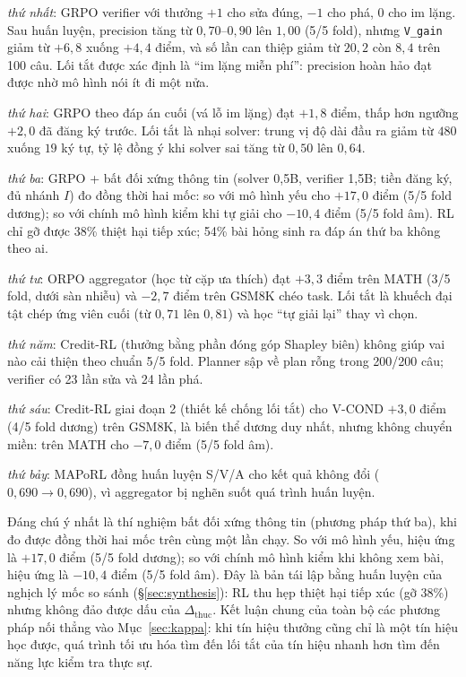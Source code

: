 \documentclass[12pt,a4paper]{article}
\newcommand{\dhonest}{\Delta_{\mathrm{thuc}}}
\begin{document}
\textit{thứ nhất}: GRPO verifier với thưởng \(+1\) cho sửa đúng, \(-1\) cho phá, \(0\) cho im lặng. Sau huấn luyện, precision tăng từ \(0{,}70\)--\(0{,}90\) lên \(1{,}00\) (5/5 fold), nhưng \texttt{V\_gain} giảm từ \(+6{,}8\) xuống \(+4{,}4\) điểm, và số lần can thiệp giảm từ \(20{,}2\) còn \(8{,}4\) trên 100 câu. Lối tắt được xác định là “im lặng miễn phí”: precision hoàn hảo đạt được nhờ mô hình nói ít đi một nửa.


\textit{thứ hai}: GRPO theo đáp án cuối (vá lỗ im lặng) đạt \(+1{,}8\) điểm, thấp hơn ngưỡng \(+2{,}0\) đã đăng ký trước. Lối tắt là nhại solver: trung vị độ dài đầu ra giảm từ \(480\) xuống \(19\) ký tự, tỷ lệ đồng ý khi solver sai tăng từ \(0{,}50\) lên \(0{,}64\).

\textit{thứ ba}: GRPO + bất đối xứng thông tin (solver 0,5B, verifier 1,5B; tiền đăng ký, đủ nhánh \(I\)) đo đồng thời hai mốc: so với mô hình yếu cho \(+17{,}0\) điểm (5/5 fold dương); so với chính mô hình kiểm khi tự giải cho \(-10{,}4\) điểm (5/5 fold âm). RL chỉ gỡ được 38\% thiệt hại tiếp xúc; 54\% bài hỏng sinh ra đáp án thứ ba không theo ai.

\textit{thứ tư}: ORPO aggregator (học từ cặp ưa thích) đạt \(+3{,}3\) điểm trên MATH (3/5 fold, dưới sàn nhiễu) và \(-2{,}7\) điểm trên GSM8K chéo task. Lối tắt là khuếch đại tật chép ứng viên cuối (từ \(0{,}71\) lên \(0{,}81\)) và học “tự giải lại” thay vì chọn.

\textit{thứ năm}: Credit-RL (thưởng bằng phần đóng góp Shapley biên) không giúp vai nào cải thiện theo chuẩn 5/5 fold. Planner sập về plan rỗng trong 200/200 câu; verifier có 23 lần sửa và 24 lần phá.

\textit{thứ sáu}: Credit-RL giai đoạn 2 (thiết kế chống lối tắt) cho V-COND \(+3{,}0\) điểm (4/5 fold dương) trên GSM8K, là biến thể dương duy nhất, nhưng không chuyển miền: trên MATH cho \(-7{,}0\) điểm (5/5 fold âm).

\textit{thứ bảy}: MAPoRL đồng huấn luyện S/V/A cho kết quả không đổi (\(0{,}690 \to 0{,}690\)), vì aggregator bị nghẽn suốt quá trình huấn luyện.

Đáng chú ý nhất là thí nghiệm bất đối xứng thông tin (phương pháp thứ ba), khi đo được đồng thời hai mốc trên cùng một lần chạy. So với mô hình yếu, hiệu ứng là \(+17{,}0\) điểm (5/5 fold dương); so với chính mô hình kiểm khi không xem bài, hiệu ứng là \(-10{,}4\) điểm (5/5 fold âm). Đây là bản tái lập bằng huấn luyện của nghịch lý mốc so sánh (\S\ref{sec:synthesis}): RL thu hẹp thiệt hại tiếp xúc (gỡ 38\%) nhưng không đảo được dấu của \(\dhonest\). Kết luận chung của toàn bộ các phương pháp nối thẳng vào Mục~\ref{sec:kappa}: khi tín hiệu thưởng cũng chỉ là một tín hiệu học được, quá trình tối ưu hóa tìm đến lối tắt của tín hiệu nhanh hơn tìm đến năng lực kiểm tra thực sự.
\end{document}
